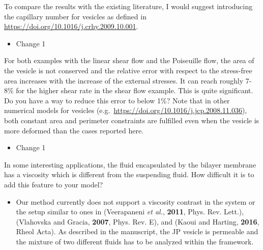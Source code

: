 \documentclass[11pt]{article}
\newcommand{\comment}[1]{{\color{blue} #1}}
\begin{document}
\noindent
\comment{To compare the results with the existing literature, I would
suggest introducing the capillary number for vesicles as defined in
\url{https://doi.org/10.1016/j.crhy.2009.10.001}.}
\begin{itemize}
  \item Change 1 
\end{itemize}

\noindent
\comment{For both examples with the linear shear flow and the Poiseuille
flow, the area of the vesicle is not conserved and the relative error
with respect to the stress-free area increases with the increase of the
external stresses. It can reach roughly 7-8\% for the higher shear rate
in the shear flow example. This is quite significant. Do you have a way
to reduce this error to below 1\%? Note that in other numerical models
for vesicles (e.g.~\url{https://doi.org/10.1016/j.jcp.2008.11.036}),
both constant area and perimeter constraints are fulfilled even when the
vesicle is more deformed than the cases reported here.}
\begin{itemize}
  \item Change 1 
\end{itemize}

\noindent
\comment{In some interesting applications, the fluid encapsulated by the
bilayer membrane has a viscosity which is different from the suspending
fluid. How difficult it is to add this feature to your model?}
\begin{itemize}
  \item 
Our method currently does not support a viscosity contrast in the system 
or the setup similar to ones in (Veerapaneni {\sl et al.}, {\bf 2011}, Phys. Rev. Lett.),
(Vlahovska and Gracia, {\bf 2007}, Phys. Rev. E), and
(Kaoui and Harting, {\bf 2016}, Rheol Acta). 
As described in the manuscript, the JP vesicle is permeable and the mixture of two different
fluids has to be analyzed within the framework. 

\end{itemize}
\end{document}
